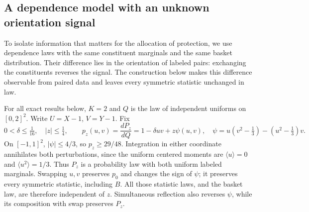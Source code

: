 \documentclass[11pt,a4paper]{amsart}
\theoremstyle{plain}
\theoremstyle{definition}
\theoremstyle{remark}
\newcommand{\br}[1]{\langle #1\rangle}
\begin{document}
\subsection{A dependence model with an unknown orientation signal}
To isolate information that matters for the allocation of protection, we use dependence laws with the same constituent marginals and the same basket distribution. Their difference lies in the orientation of labeled pairs: exchanging the constituents reverses the signal. The construction below makes this difference observable from paired data and leaves every symmetric statistic unchanged in law.

For all exact results below, $K=2$ and $Q$ is the law of independent uniforms on $[0,2]^2$. Write $U=X-1$, $V=Y-1$. Fix
\begin{equation}\label{eq:retainedlaw}
 0<\delta\le\tfrac1{16},\quad |z|\le\tfrac14,\qquad
 p_z(u,v)=\frac{dP_z}{dQ}=1-\delta uv+z\psi(u,v),
 \quad \psi=u(v^2-\tfrac13)-(u^2-\tfrac13)v.
\end{equation}
On $[-1,1]^2$, $|\psi|\le4/3$, so $p_z\ge29/48$. Integration in either coordinate annihilates both perturbations, since the uniform centered moments are $\br{u}=0$ and $\br{u^2}=1/3$. Thus $P_z$ is a probability law with both uniform labeled marginals. Swapping $u,v$ preserves $p_0$ and changes the sign of $\psi$; it preserves every symmetric statistic, including $B$. All those statistic laws, and the basket law, are therefore independent of $z$. Simultaneous reflection also reverses $\psi$, while its composition with swap preserves $P_z$.
\end{document}
